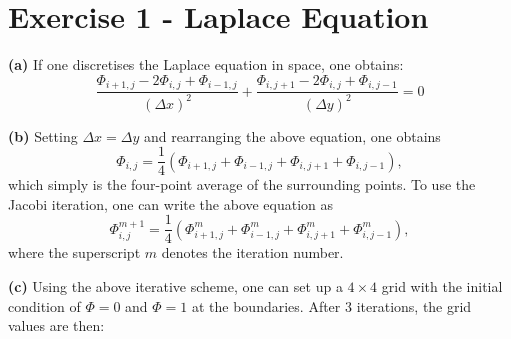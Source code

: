 \section*{Exercise 1 - Laplace Equation}
\textbf{(a)} If one discretises the Laplace equation in space, one obtains:
\begin{equation}
    \frac{\Phi_{i+1,j} - 2\Phi_{i,j} + \Phi_{i-1,j}}{\left(\Delta x\right)^2} + \frac{\Phi_{i,j+1} - 2\Phi_{i,j} + \Phi_{i,j-1}}{\left(\Delta y\right)^2} = 0
\end{equation}

\textbf{(b)} Setting $\Delta x = \Delta y$ and rearranging the above equation, one obtains
\begin{equation}
    \Phi_{i,j} = \frac{1}{4} \left( \Phi_{i+1,j} + \Phi_{i-1,j} + \Phi_{i,j+1} + \Phi_{i,j-1} \right),
\end{equation}
which simply is the four-point average of the surrounding points. To use the Jacobi iteration, one can write the above equation as
\begin{equation}
    \Phi_{i,j}^{m+1} = \frac{1}{4} \left( \Phi_{i+1,j}^m + \Phi_{i-1,j}^m + \Phi_{i,j+1}^m + \Phi_{i,j-1}^m \right),
\end{equation}
where the superscript $m$ denotes the iteration number.

\textbf{(c)} 
Using the above iterative scheme, one can set up a $4 \times 4$ grid with the initial condition of $\Phi = 0$ and $\Phi = 1$ at the boundaries. After 3 iterations, the grid values are then: 

